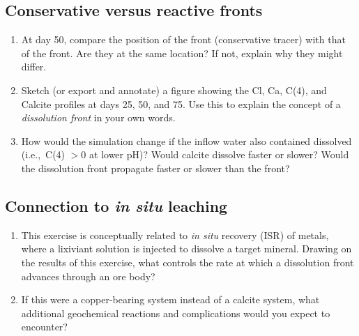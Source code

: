 \subsection{Conservative versus reactive fronts}

\begin{enumerate}

\item At day 50, compare the position of the  front
  (conservative tracer) with that of the  front.  Are they
  at the same location?  If not, explain why they might differ.

\item Sketch (or export and annotate) a figure showing the Cl, Ca, C(4),
  and Calcite profiles at days 25, 50, and 75.  Use this to explain the
  concept of a \emph{dissolution front} in your own words.

\item How would the simulation change if the inflow water also contained
  dissolved  (i.e.,\ C(4) $> 0$ at lower pH)?  Would calcite
  dissolve faster or slower?  Would the dissolution front propagate
  faster or slower than the  front?

\end{enumerate}

\subsection{Connection to \textit{in situ} leaching}

\begin{enumerate}

\item This exercise is conceptually related to \textit{in situ} recovery
  (ISR) of metals, where a lixiviant solution is injected to dissolve a
  target mineral.  Drawing on the results of this exercise, what
  controls the rate at which a dissolution front advances through an ore
  body?

\item If this were a copper-bearing system instead of a calcite system,
  what additional geochemical reactions and complications would you
  expect to encounter?

\end{enumerate}



